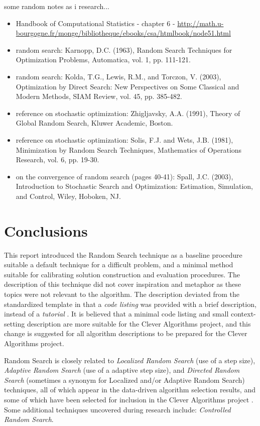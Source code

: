 \documentclass[a4paper, 11pt]{article}
\begin{document}
some random notes as i research...
\begin{itemize}
	\item Handbook of Computational Statistics - chapter 6 - \url{http://math.u-bourgogne.fr/monge/bibliotheque/ebooks/csa/htmlbook/node51.html}
	\item random search: Karnopp, D.C. (1963), Random Search Techniques for Optimization Problems, Automatica, vol. 1, pp. 111-121.
	\item random search: Kolda, T.G., Lewis, R.M., and Torczon, V. (2003), Optimization by Direct Search: New Perspectives on Some Classical and Modern Methods, SIAM Review, vol. 45, pp. 385-482.
	\item reference on stochastic optimization: Zhigljavsky, A.A. (1991), Theory of Global Random Search, Kluwer Academic, Boston.
	\item reference on stochastic optimization: Solis, F.J. and Wets, J.B. (1981), Minimization by Random Search Techniques, Mathematics of Operations Research, vol. 6, pp. 19-30.
	\item on the convergence of random search (pages 40-41): Spall, J.C. (2003), Introduction to Stochastic Search and Optimization: Estimation, Simulation, and Control, Wiley, Hoboken, NJ.
\end{itemize}


% 
% 
\section{Conclusions}
\label{sec:conclusions}
This report introduced the Random Search technique as a baseline procedure suitable a default technique for a difficult problem, and a minimal method suitable for calibrating solution construction and evaluation procedures.
The description of this technique did not cover inspiration and metaphor as these topics were not relevant to the algorithm. The description deviated from the standardized template in that a \emph{code listing} was provided with a brief description, instead of a \emph{tutorial} \cite{Brownlee2010a}. It is believed that a minimal code listing and small context-setting description are more suitable for the Clever Algorithms project, and this change is suggested for all algorithm descriptions to be prepared for the Clever Algorithms project. 

Random Search is closely related to \emph{Localized Random Search} (use of a step size), \emph{Adaptive Random Search} (use of a adaptive step size), and \emph{Directed Random Search} (sometimes a synonym for Localized and/or Adaptive Random Search) techniques, all of which appear in the data-driven algorithm selection results, and some of which have been selected for inclusion in the Clever Algorithms project \cite{Brownlee2010b}.
Some additional techniques uncovered during research include: \emph{Controlled Random Search}.



\end{document}
